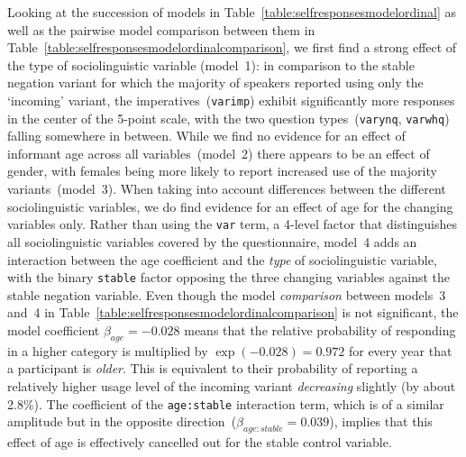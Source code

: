 Looking at the succession of models in Table~\ref{table:selfresponsesmodelordinal} as well as the pairwise model comparison between them in Table~\ref{table:selfresponsesmodelordinalcomparison}, we first find a strong effect of the type of sociolinguistic variable (model~1): in comparison to the stable negation variant for which the majority of speakers reported using only the `incoming' variant, the imperatives~(\texttt{varimp}) exhibit significantly more responses in the center of the 5-point scale, with the two question types~(\texttt{varynq}, \texttt{varwhq}) falling somewhere in between. While we find no evidence for an effect of informant age across all variables~(model~2) there appears to be an effect of gender, with females being more likely to report increased use of the majority variants~(model~3). %
When taking into account differences between the different sociolinguistic variables, we do find evidence for an effect of age for the changing variables only.
Rather than using the \texttt{var} term, a 4-level factor that distinguishes all sociolinguistic variables covered by the questionnaire, model~4 adds an interaction between the age coefficient and the \emph{type} of sociolinguistic variable, with the binary \texttt{stable} factor opposing the three changing variables against the stable negation variable.
Even though the model \emph{comparison} between models~3 and~4 in Table~\ref{table:selfresponsesmodelordinalcomparison} is not significant, 
the model coefficient $\beta_{age}=\ensuremath{-0.028}$ means that the relative probability of responding in a higher category is multiplied by $\exp(\ensuremath{-0.028})=0.972$ for every year that a participant is \emph{older}. This is equivalent to their probability of reporting a relatively higher usage level of the incoming variant \emph{decreasing} slightly (by about 2.8\%). The coefficient of the \texttt{age:stable} interaction term, which is of a similar amplitude but in the opposite direction~($\beta_{age:stable}=0.039$), implies that this effect of age is effectively cancelled out for the stable control variable.


